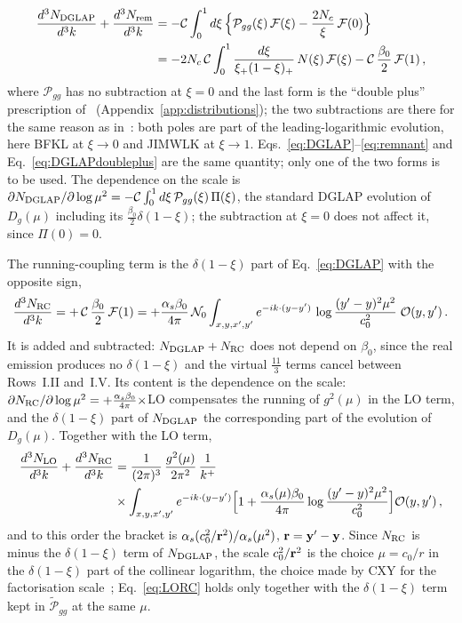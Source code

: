 \begin{align}\label{eq:DGLAPdoubleplus}
\frac{d^3N_{\rm DGLAP}}{d^3k}+\frac{d^3N_{\rm rem}}{d^3k}&=-\mathcal C\int_0^1d\xi\,\Big\{\mathcal P_{gg}(\xi)\,\mathcal F(\xi)-\frac{2N_c}{\xi}\,\mathcal F(0)\Big\}\notag\\
&=-2N_c\,\mathcal C\int_0^1\frac{d\xi}{\xi_+(1-\xi)_+}\,N(\xi)\,\mathcal F(\xi)-\mathcal C\,\frac{\beta_0}{2}\,\mathcal F(1)\,,
\end{align}
where $\mathcal P_{gg}$ has no subtraction at $\xi=0$ and the last form is the ``double plus'' prescription of~\cite{Kovner:2023vsy} (Appendix~\ref{app:distributions}); the two subtractions are there for the same reason as in~\cite{Kovner:2023vsy}: both poles are part of the leading-logarithmic evolution, here BFKL at $\xi\to0$ and JIMWLK at $\xi\to1$. Eqs.~\eqref{eq:DGLAP}--\eqref{eq:remnant} and Eq.~\eqref{eq:DGLAPdoubleplus} are the same quantity; only one of the two forms is to be used. The dependence on the scale is $\partial N_{\rm DGLAP}/\partial\log\mu^2=-\mathcal C\int_0^1d\xi\,\mathcal P_{gg}(\xi)\,\Pi(\xi)$, the standard DGLAP evolution of $D_g(\mu)$ including its $\frac{\beta_0}{2}\delta(1-\xi)$; the subtraction at $\xi=0$ does not affect it, since $\Pi(0)=0$.

The running-coupling term is the $\delta(1-\xi)$ part of Eq.~\eqref{eq:DGLAP} with the opposite sign,
\begin{align}\label{eq:RC}
\frac{d^3N_{\rm RC}}{d^3k}=+\,\mathcal C\,\frac{\beta_0}{2}\,\mathcal F(1)=+\frac{\alpha_s\beta_0}{4\pi}\,\mathcal N_0\int_{x,y,x',y'}e^{-ik\cdot(y-y')}\,\log\frac{(y'-y)^2\mu^2}{c_0^2}\;\mathcal O(y,y')\,.
\end{align}
It is added and subtracted: $N_{\rm DGLAP}+N_{\rm RC}$ does not depend on $\beta_0$, since the real emission produces no $\delta(1-\xi)$ and the virtual $\frac{11}{3}$ terms cancel between Rows~I.II and~I.V. Its content is the dependence on the scale: $\partial N_{\rm RC}/\partial\log\mu^2=+\frac{\alpha_s\beta_0}{4\pi}\times$LO compensates the running of $g^2(\mu)$ in the LO term, and the $\delta(1-\xi)$ part of $N_{\rm DGLAP}$ the corresponding part of the evolution of $D_g(\mu)$. Together with the LO term,
\begin{align}\label{eq:LORC}
\frac{d^3N_{\rm LO}}{d^3k}+\frac{d^3N_{\rm RC}}{d^3k}&=\frac{1}{(2\pi)^3}\,\frac{g^2(\mu)}{2\pi^2}\,\frac{1}{k^+}\notag\\&\times\int_{x,y,x',y'}e^{-ik\cdot(y-y')}\Big[1+\frac{\alpha_s(\mu)\beta_0}{4\pi}\log\frac{(y'-y)^2\mu^2}{c_0^2}\Big]\mathcal O(y,y')\,,
\end{align}
and to this order the bracket is $\alpha_s(c_0^2/\mathbf{r}^2)/\alpha_s(\mu^2)$, $\mathbf{r}=\mathbf{y}'-\mathbf{y}$. Since $N_{\rm RC}$ is minus the $\delta(1-\xi)$ term of $N_{\rm DGLAP}$, the scale $c_0^2/\mathbf{r}^2$ is the choice $\mu=c_0/r$ in the $\delta(1-\xi)$ part of the collinear logarithm, the choice made by CXY for the factorisation scale~\cite{Chirilli:2012jd}; Eq.~\eqref{eq:LORC} holds only together with the $\delta(1-\xi)$ term kept in $\widetilde{\mathcal P}_{gg}$ at the same $\mu$.

